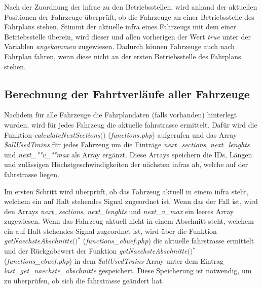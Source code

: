 Nach der Zuordnung der \ac{infra}e zu den Betriebsstellen, wird anhand der aktuellen Positionen der Fahrzeuge überprüft, ob die Fahrzeuge an einer Betriebsstelle des Fahrplans stehen. Stimmt der aktuelle \ac{infra} eines Fahrzeugs mit dem einer Betriebsstelle überein, wird dieser und allen vorherigen der Wert \textit{true} unter der Variablen \textit{angekommen} zugewiesen. Dadurch können Fahrzeuge auch nach Fahrplan fahren, wenn diese nicht an der ersten Betriebsstelle des Fahrplans stehen. 
\subsection{Berechnung der Fahrtverläufe aller Fahrzeuge} \label{main_3}
Nachdem für alle Fahrzeuge die Fahrplandaten (falls vorhanden) hinterlegt wurden, wird für jedes Fahrzeug die aktuelle  \Gls{fahrstrasse} ermittelt. Dafür wird die Funktion \textit{calculateNextSections$($$)$} (\textit{functions.php}) aufgerufen und das Array \textit{\$allUsedTrains} für jedes Fahrzeug um die Einträge \textit{next\_sections}, \textit{next\_lenghts} und \textit{next\_""v\_""max} als Array ergänzt. Diese Arrays speichern die IDs, Längen und zulässigen Höchstgeschwindigkeiten der nächsten \acp{infra} ab, welche auf der \Gls{fahrstrasse} liegen. 

Im ersten Schritt wird überprüft, ob das Fahrzeug aktuell in einem \ac{infra} steht, welchem ein auf Halt stehendes Signal zugeordnet ist. Wenn das der Fall ist, wird den Arrays \textit{next\_sections}, \textit{next\_lenghts} und \textit{next\_v\_max} ein leeres Array zugewiesen. Wenn das Fahrzeug aktuell nicht in einem Abschnitt steht, welchem ein auf Halt stehendes Signal zugeordnet ist, wird über die Funktion \textit{getNaechsteAbschnitte$($$)$}$^\ast$ (\textit{functions\_ebuef.php}) die aktuelle \Gls{fahrstrasse} ermittelt und der Rückgabewert der Funktion \textit{getNaechsteAbschnitte$($$)$}$^\ast$ (\textit{functions\_ebuef.php}) in dem \textit{\$allUsedTrains}-Array unter dem Eintrag \textit{last\_get\_naechste\_abschnitte} gespeichert. Diese Speicherung ist notwendig, um zu überprüfen, ob sich die \Gls{fahrstrasse} geändert hat. 

